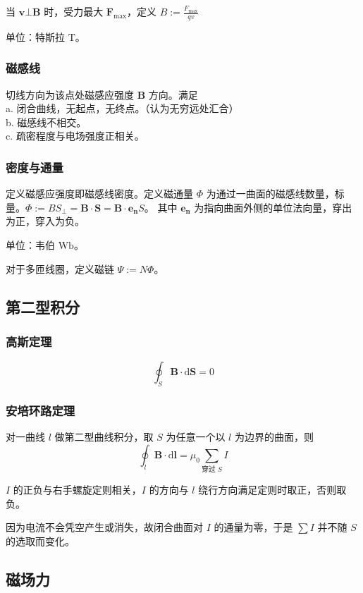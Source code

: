 \documentclass[12pt, a4paper, UTF8, openany]{ctexbook}
\newcommand{\dif}{\mathrm{d}}
\newcommand{\vect}[1]{\mathbf{#1}}
\newcommand{\vecv}{\vect{v}}
\newcommand{\vecf}{\vect{F}}
\newcommand{\en}{\vect{e_{n}}}
\newcommand{\vecl}{\vect{l}}
\newcommand{\vecs}{\vect{S}}
\newcommand{\vecb}{\vect{B}}
\newcommand{\unit}[1]{\mathrm{#1}}
\begin{document}
        当 $\vecv \bot \vecb$ 时，受力最大 $\vecf_{\max}$，定义 $B := \frac{F_{\max}}{qv}$

        单位：特斯拉 $\unit{T}$。

        \subsubsection{磁感线}
        切线方向为该点处磁感应强度 $\vecb$ 方向。满足 \\
        a. 闭合曲线，无起点，无终点。（认为无穷远处汇合）\\
        b. 磁感线不相交。\\
        c. 疏密程度与电场强度正相关。

        \subsubsection{密度与通量}
        定义磁感应强度即磁感线密度。定义磁通量 $\Phi$ 为通过一曲面的磁感线数量，标量。$\Phi := BS_{\bot} = \vecb \cdot \vecs = \vecb \cdot \en S$。
        其中 $\en$ 为指向曲面{\heiti 外侧}的单位法向量，穿出为正，穿入为负。

        单位：韦伯 $\unit{Wb}$。

        对于多匝线圈，定义磁链 $\Psi := N\Phi$。

        \subsection{第二型积分}
        \subsubsection{高斯定理}
        $$\oint_{S} \vecb \cdot \dif \vecs = 0$$

        \subsubsection{安培环路定理}
        对一曲线 $l$ 做第二型曲线积分，取 $S$ 为任意一个以 $l$ 为边界的曲面，则
        $$\oint_{l} \vecb \cdot \dif \vecl = \mu_0 \sum_{\text{穿过 }S} I$$

        {\heiti $I$ 的正负与右手螺旋定则相关}，$I$ 的方向与 $l$ 绕行方向满足定则时取正，否则取负。
 
        因为电流不会凭空产生或消失，故闭合曲面对 $I$ 的通量为零，于是 $\sum I$ 并不随 $S$ 的选取而变化。

        \subsection{磁场力}
\end{document}
